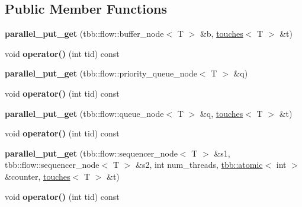 \subsection*{Public Member Functions}
\begin{DoxyCompactItemize}
\item 
\hypertarget{structparallel__put__get_a4f4b88e82f730a7b91e2a9af89b4cbbf}{}{\bfseries parallel\+\_\+put\+\_\+get} (tbb\+::flow\+::buffer\+\_\+node$<$ T $>$ \&b, \hyperlink{structtouches}{touches}$<$ T $>$ \&t)\label{structparallel__put__get_a4f4b88e82f730a7b91e2a9af89b4cbbf}

\item 
\hypertarget{structparallel__put__get_ae35ee5d8bc7e8dd341dd09bcc4ecab90}{}void {\bfseries operator()} (int tid) const \label{structparallel__put__get_ae35ee5d8bc7e8dd341dd09bcc4ecab90}

\item 
\hypertarget{structparallel__put__get_aa6fc2385f72ce71393acbc437e43fe97}{}{\bfseries parallel\+\_\+put\+\_\+get} (tbb\+::flow\+::priority\+\_\+queue\+\_\+node$<$ T $>$ \&q)\label{structparallel__put__get_aa6fc2385f72ce71393acbc437e43fe97}

\item 
\hypertarget{structparallel__put__get_ae35ee5d8bc7e8dd341dd09bcc4ecab90}{}void {\bfseries operator()} (int tid) const \label{structparallel__put__get_ae35ee5d8bc7e8dd341dd09bcc4ecab90}

\item 
\hypertarget{structparallel__put__get_a72ee52bc0549b03ccb16b4fb9867e082}{}{\bfseries parallel\+\_\+put\+\_\+get} (tbb\+::flow\+::queue\+\_\+node$<$ T $>$ \&q, \hyperlink{structtouches}{touches}$<$ T $>$ \&t)\label{structparallel__put__get_a72ee52bc0549b03ccb16b4fb9867e082}

\item 
\hypertarget{structparallel__put__get_ae35ee5d8bc7e8dd341dd09bcc4ecab90}{}void {\bfseries operator()} (int tid) const \label{structparallel__put__get_ae35ee5d8bc7e8dd341dd09bcc4ecab90}

\item 
\hypertarget{structparallel__put__get_ab8283f77e813258505852ccd5ae91989}{}{\bfseries parallel\+\_\+put\+\_\+get} (tbb\+::flow\+::sequencer\+\_\+node$<$ T $>$ \&s1, tbb\+::flow\+::sequencer\+\_\+node$<$ T $>$ \&s2, int num\+\_\+threads, \hyperlink{structtbb_1_1atomic}{tbb\+::atomic}$<$ int $>$ \&counter, \hyperlink{structtouches}{touches}$<$ T $>$ \&t)\label{structparallel__put__get_ab8283f77e813258505852ccd5ae91989}

\item 
\hypertarget{structparallel__put__get_ae35ee5d8bc7e8dd341dd09bcc4ecab90}{}void {\bfseries operator()} (int tid) const \label{structparallel__put__get_ae35ee5d8bc7e8dd341dd09bcc4ecab90}

\end{DoxyCompactItemize}
